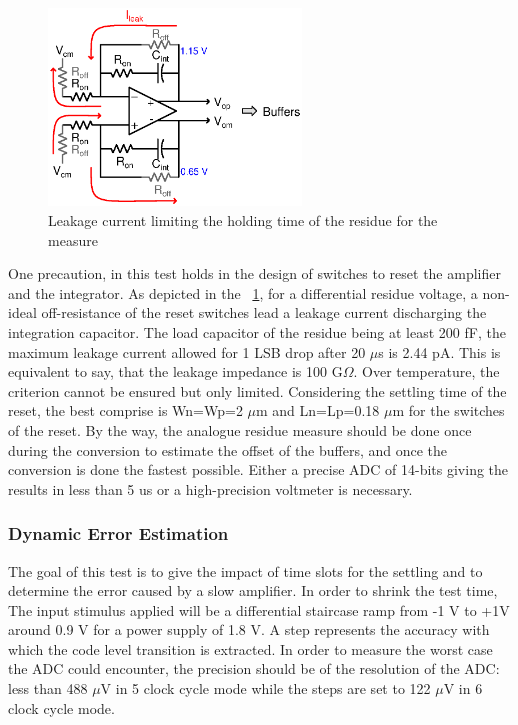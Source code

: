 \begin{figure}[htp]
    \centering
    \includegraphics[width=0.6\textwidth]{Chapter5/Figs/adc_chip/sd_integrator_leakage.ps}
    \caption{Leakage current limiting the holding time of the residue for the measure}
    \label{fig:adc-static-test-leakage}
\end{figure}

One precaution, in this test holds in the design of switches to reset the amplifier and the integrator. As depicted in the \figurename~\ref{fig:adc-static-test-leakage}, for a differential residue voltage, a non-ideal off-resistance of the reset switches lead a leakage current discharging the integration capacitor. The load capacitor of the residue being at least 200 fF, the maximum leakage current allowed for 1 LSB drop after 20 $\mu$s is 2.44 pA. This is equivalent to say, that the leakage impedance is 100 G$\Omega$. Over temperature, the criterion cannot be ensured but only limited. Considering the settling time of the reset, the best comprise is Wn=Wp=2 $\mu$m and Ln=Lp=0.18 $\mu$m for the switches of the reset.
By the way, the analogue residue measure should be done once during the conversion to estimate the offset of the buffers, and once the conversion is done the fastest possible. Either a precise ADC of 14-bits giving the results in less than 5 us or a high-precision voltmeter is necessary.

    \subsubsection{Dynamic Error Estimation}
The goal of this test is to give the impact of time slots for the settling and to determine the error caused by a slow amplifier. In order to shrink the test time, The input stimulus applied will be a differential staircase ramp from -1 V to +1V around 0.9 V for a power supply of 1.8 V. A step represents the accuracy with which the code level transition is extracted. In order to measure the worst case the ADC could encounter, the precision should be of the resolution of the ADC: less than 488 $\mu$V in 5 clock cycle mode while the steps are set to 122 $\mu$V in 6 clock cycle mode.

